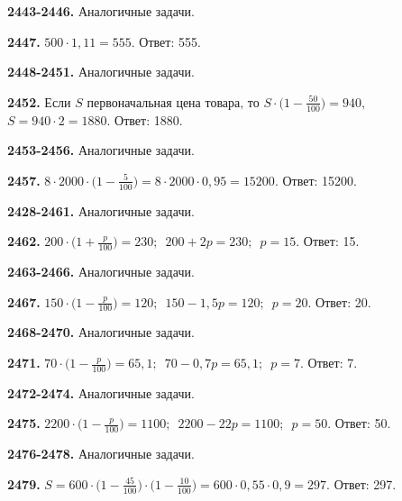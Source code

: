 \textbf{2443-2446.} Аналогичные задачи. 

\textbf{2447.} $500 \cdot 1,11 = 555.$ \newline \null \hspace*{\fill} Ответ: 555. 

\textbf{2448-2451.} Аналогичные задачи. 

\textbf{2452.} $\text{Если } S \text{ первоначальная цена товара, то } S \cdot \big(1 - \frac{50}{100}\big)=940,$ \newline{}$ S = 940 \cdot 2 = 1880.$ \newline \null \hspace*{\fill} Ответ: 1880. 

\textbf{2453-2456.} Аналогичные задачи. 

\textbf{2457.} $8 \cdot 2000 \cdot \big(1 - \frac{5}{100}\big) = 8 \cdot 2000 \cdot 0,95 = 15200.$ \newline \null \hspace*{\fill} Ответ: 15200. 

\textbf{2428-2461.} Аналогичные задачи. 

\textbf{2462.} $200 \cdot \big(1 + \frac{p}{100}\big)=230;\enspace 200 + 2p = 230;\enspace p=15.$ \newline \null \hspace*{\fill} Ответ: 15. 

\textbf{2463-2466.} Аналогичные задачи. 

\textbf{2467.} $150 \cdot \big( 1 - \frac{p}{100}\big)=120;\enspace 150 - 1,5p = 120;\enspace p=20.$ \newline \null \hspace*{\fill} Ответ: 20. 

\textbf{2468-2470.} Аналогичные задачи.

\textbf{2471.} $70 \cdot \big(1 - \frac{p}{100}\big)=65,1;\enspace 70 - 0,7p = 65,1;\enspace p = 7.$ \newline \null \hspace*{\fill} Ответ: 7. 

\textbf{2472-2474.} Аналогичные задачи.

\textbf{2475.} $2200 \cdot \big(1 - \frac{p}{100}\big) = 1100;\enspace 2200 - 22p = 1100;\enspace p = 50.$ \newline \null \hspace*{\fill} Ответ: 50. 

\textbf{2476-2478.} Аналогичные задачи.

\textbf{2479.} $S = 600 \cdot \big( 1 -\frac{45}{100}\big)\cdot\big( 1 - \frac{10}{100}\big) = 600 \cdot 0,55 \cdot 0,9 = 297.$ \newline \null \hspace*{\fill} Ответ: 297. 

